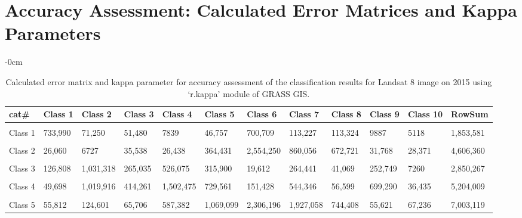 \documentclass[analytics,article,accept,pdftex,moreauthors]{Definitions/mdpi}
\begin{document}
\section[\appendixname~\thesection]{Accuracy Assessment: Calculated Error Matrices and Kappa Parameters}\label{AppA}

\vspace{-6pt}  
\begin{table}[H] 
\tablesize{\footnotesize}
    \caption{Calculated error matrix and kappa parameter for accuracy assessment of the classification results for Landsat 8 image on 2015 %
 using `r.kappa' module of GRASS GIS.}%
    \begin{adjustwidth}{-\extralength}{0cm}
 	\begin{tabularx}{\fulllength}{lllllllllllL}
    \toprule
        \textbf{cat\#} & \textbf{Class 1} & \textbf{Class 2} & \textbf{Class 3} & \textbf{Class 4} & \textbf{Class 5} & \textbf{Class 6} & \textbf{Class 7} & \textbf{Class 8} & \textbf{Class 9} & \textbf{Class 10} & \textbf{RowSum} \\ \hline
      &&&&&&&&&&&\\[-2ex]
        Class 1 & 733,990 %
 & 71,250 & 51,480 & 7839 & 46,757 & 700,709 & 113,227 & 113,324 & 9887 & 5118 & 1,853,581 \\ \hline
      &&&&&&&&&&&\\[-2ex]
        Class 2 & 26,060 & 6727 & 35,538 & 26,438 & 364,431 & 2,554,250 & 860,056 & 672,721 & 31,768 & 28,371 & 4,606,360 \\ \hline
      &&&&&&&&&&&\\[-2ex]
        Class 3 & 126,808 & 1,031,318 & 265,035 & 526,075 & 315,900 & 19,612 & 264,441 & 41,069 & 252,749 & 7260 & 2,850,267 \\ \hline
      &&&&&&&&&&&\\[-2ex]
        Class 4 & 49,698 & 1,019,916 & 414,261 & 1,502,475 & 729,561 & 151,428 & 544,346 & 56,599 & 699,290 & 36,435 & 5,204,009 \\ \hline
      &&&&&&&&&&&\\[-2ex]
        Class 5 & 55,812 & 124,601 & 65,706 & 587,382 & 1,069,099 & 2,306,196 & 1,927,058 & 744,408 & 55,621 & 67,236 & 7,003,119 \\ \hline

\end{tabularx}
\end{adjustwidth}
\end{table}
\end{document}
